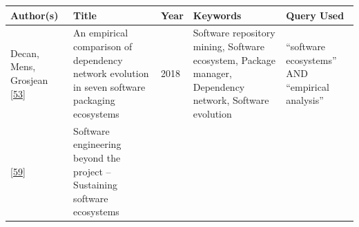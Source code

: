 \documentclass[]{book}
\begin{document}
\begin{longtable}[]{@{}lllll@{}}
\toprule
\begin{minipage}[b]{0.05\columnwidth}\raggedright\strut
Author(s)\strut
\end{minipage} & \begin{minipage}[b]{0.31\columnwidth}\raggedright\strut
Title\strut
\end{minipage} & \begin{minipage}[b]{0.02\columnwidth}\raggedright\strut
Year\strut
\end{minipage} & \begin{minipage}[b]{0.34\columnwidth}\raggedright\strut
Keywords\strut
\end{minipage} & \begin{minipage}[b]{0.13\columnwidth}\raggedright\strut
Query Used\strut
\end{minipage}\tabularnewline
\midrule
\endhead
\begin{minipage}[t]{0.05\columnwidth}\raggedright\strut
Decan, Mens, Grosjean {[}\protect\hyperlink{ref-Decan2018}{53}{]}\strut
\end{minipage} & \begin{minipage}[t]{0.31\columnwidth}\raggedright\strut
An empirical comparison of dependency network evolution in seven
software packaging ecosystems\strut
\end{minipage} & \begin{minipage}[t]{0.02\columnwidth}\raggedright\strut
2018\strut
\end{minipage} & \begin{minipage}[t]{0.34\columnwidth}\raggedright\strut
Software repository mining, Software ecosystem, Package manager,
Dependency network, Software evolution\strut
\end{minipage} & \begin{minipage}[t]{0.13\columnwidth}\raggedright\strut
``software ecosystems'' AND ``empirical analysis''\strut
\end{minipage}\tabularnewline
\begin{minipage}[t]{0.05\columnwidth}\raggedright\strut
{[}\protect\hyperlink{ref-Dittrich2014}{59}{]}\strut
\end{minipage} & \begin{minipage}[t]{0.31\columnwidth}\raggedright\strut
Software engineering beyond the project -- Sustaining software
ecosystems\strut
\end{minipage} & \begin{minipage}[t]{0.02\columnwidth}\raggedright\strut

\end{minipage}
\end{longtable}
\end{document}
